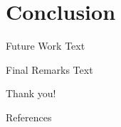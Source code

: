\documentclass{beamer}
\begin{document}
    \section{Conclusion}

    \begin{frame}{Future Work}
        Text
    \end{frame}

    \begin{frame}{Final Remarks}
        Text
    \end{frame}


    {
    \begin{frame}[standout]
        Thank you!
    \end{frame}
    }

    \appendix

    \begin{frame}[allowframebreaks]{References}
        \printbibliography[heading=none]
    \end{frame}
\end{document}
